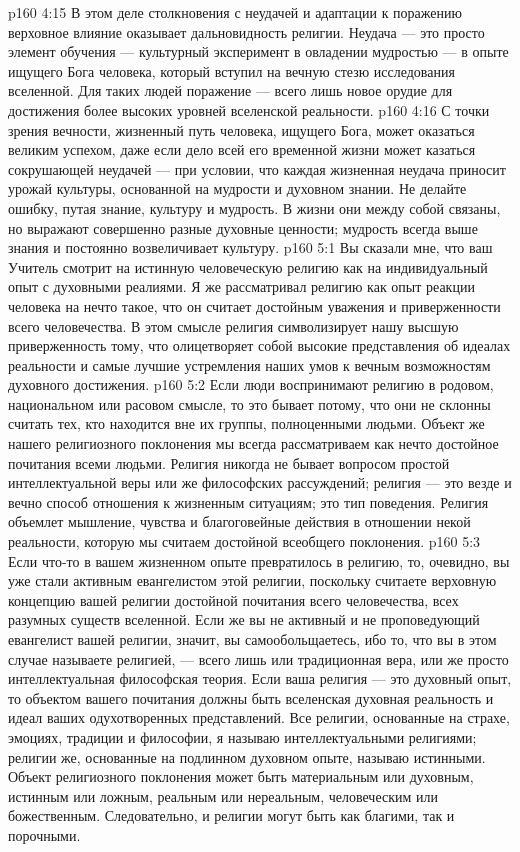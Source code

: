 \vs p160 4:15 В этом деле столкновения с неудачей и адаптации к поражению верховное влияние оказывает дальновидность религии. Неудача --- это просто элемент обучения --- культурный эксперимент в овладении мудростью --- в опыте ищущего Бога человека, который вступил на вечную стезю исследования вселенной. Для таких людей поражение --- всего лишь новое орудие для достижения более высоких уровней вселенской реальности.
\vs p160 4:16 С точки зрения вечности, жизненный путь человека, ищущего Бога, может оказаться великим успехом, даже если дело всей его временной жизни может казаться сокрушающей неудачей --- при условии, что каждая жизненная неудача приносит урожай культуры, основанной на мудрости и духовном знании. Не делайте ошибку, путая знание, культуру и мудрость. В жизни они между собой связаны, но выражают совершенно разные духовные ценности; мудрость всегда выше знания и постоянно возвеличивает культуру.
\vs p160 5:1 Вы сказали мне, что ваш Учитель смотрит на истинную человеческую религию как на индивидуальный опыт с духовными реалиями. Я же рассматривал религию как опыт реакции человека на нечто такое, что он считает достойным уважения и приверженности всего человечества. В этом смысле религия символизирует нашу высшую приверженность тому, что олицетворяет собой высокие представления об идеалах реальности и самые лучшие устремления наших умов к вечным возможностям духовного достижения.
\vs p160 5:2 Если люди воспринимают религию в родовом, национальном или расовом смысле, то это бывает потому, что они не склонны считать тех, кто находится вне их группы, полноценными людьми. Объект же нашего религиозного поклонения мы всегда рассматриваем как нечто достойное почитания всеми людьми. Религия никогда не бывает вопросом простой интеллектуальной веры или же философских рассуждений; религия --- это везде и вечно способ отношения к жизненным ситуациям; это тип поведения. Религия объемлет мышление, чувства и благоговейные действия в отношении некой реальности, которую мы считаем достойной всеобщего поклонения.
\vs p160 5:3 Если что\hyp{}то в вашем жизненном опыте превратилось в религию, то, очевидно, вы уже стали активным евангелистом этой религии, поскольку считаете верховную концепцию вашей религии достойной почитания всего человечества, всех разумных существ вселенной. Если же вы не активный и не проповедующий евангелист вашей религии, значит, вы самообольщаетесь, ибо то, что вы в этом случае называете религией, --- всего лишь или традиционная вера, или же просто интеллектуальная философская теория. Если ваша религия --- это духовный опыт, то объектом вашего почитания должны быть вселенская духовная реальность и идеал ваших одухотворенных представлений. Все религии, основанные на страхе, эмоциях, традиции и философии, я называю интеллектуальными религиями; религии же, основанные на подлинном духовном опыте, называю истинными. Объект религиозного поклонения может быть материальным или духовным, истинным или ложным, реальным или нереальным, человеческим или божественным. Следовательно, и религии могут быть как благими, так и порочными.
